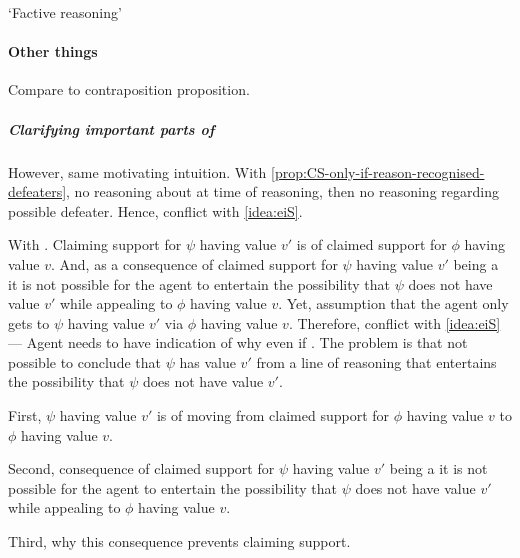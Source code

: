 \begin{note}
  `Factive reasoning'
\end{note}

\paragraph{Other things}

\begin{note}
  \color{red} Compare to contraposition proposition.
\end{note}


\hozline

\newpage


\subparagraph{Clarifying important parts of \nI{}}

\begin{note}
    However, same motivating intuition.
  With \autoref{prop:CS-only-if-reason-recognised-defeaters}, no reasoning about \requ{} at time of reasoning, then no reasoning regarding possible defeater.
  Hence, conflict with \autoref{idea:eiS}.

  With \nI{}.
  Claiming support for \(\psi\) having value \(v'\) is \requ{} of claimed support for \(\phi\) having value \(v\).
  And, as a consequence of claimed support for \(\psi\) having value \(v'\) being a \requ{} it is not possible for the agent to entertain the possibility that \(\psi\) does not have value \(v'\) while appealing to \(\phi\) having value \(v\).
  Yet, assumption that the agent only gets to \(\psi\) having value \(v'\) via \(\phi\) having value \(v\).
  Therefore, conflict with \autoref{idea:eiS} --- Agent needs to have indication of why even if \mom{}.
  The problem is that not possible to conclude that \(\psi\) has value \(v'\) from a line of reasoning that entertains the possibility that \(\psi\) does not have value \(v'\).
\end{note}

\begin{note}
  First, \(\psi\) having value \(v'\) is \requ{} of moving from claimed support for \(\phi\) having value \(v\) to \(\phi\) having value \(v\).

  Second, consequence of claimed support for \(\psi\) having value \(v'\) being a \requ{} it is not possible for the agent to entertain the possibility that \(\psi\) does not have value \(v'\) while appealing to \(\phi\) having value \(v\).

  Third, why this consequence prevents claiming support.
\end{note}

